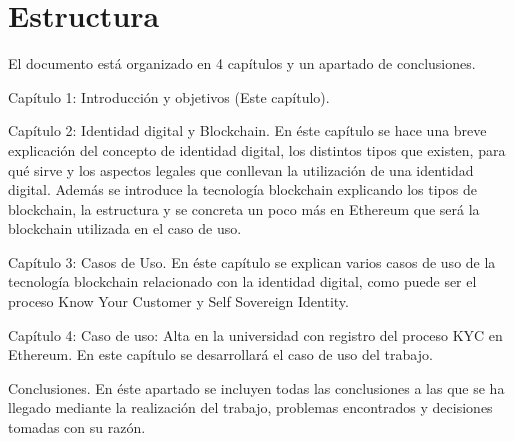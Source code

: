 \documentclass[12pt]{report}
\begin{document}
\section{Estructura}
El documento está organizado en 4 capítulos y un apartado de conclusiones. 

Capítulo 1: Introducción y objetivos (Este capítulo).

Capítulo 2: Identidad digital y Blockchain.
En éste capítulo se hace una breve explicación del concepto de identidad digital, los distintos tipos que existen, para qué sirve y los aspectos legales que conllevan la utilización de una identidad digital.
Además se introduce la tecnología blockchain explicando los tipos de blockchain, la estructura y se concreta un poco más en Ethereum que será la blockchain utilizada en el caso de uso.

Capítulo 3: Casos de Uso.
En éste capítulo se explican varios casos de uso de la tecnología blockchain relacionado con la identidad digital, como puede ser el proceso Know Your Customer y Self Sovereign Identity.


Capítulo 4: Caso de uso: Alta en la universidad con registro del proceso KYC en Ethereum.
En este capítulo se desarrollará el caso de uso del trabajo.

Conclusiones.
En éste apartado se incluyen todas las conclusiones a las que se ha llegado mediante la realización del trabajo, problemas encontrados y decisiones tomadas con su razón.
\end{document}
